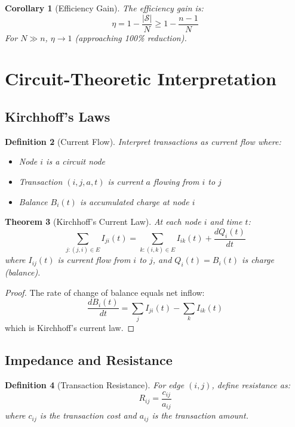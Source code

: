 \documentclass[12pt]{article}
\newtheorem{theorem}{Theorem}
\newtheorem{definition}[theorem]{Definition}
\newtheorem{corollary}[theorem]{Corollary}
\begin{document}
\begin{corollary}[Efficiency Gain]
The efficiency gain is:
$$
\eta = 1 - \frac{|\mathcal{S}|}{N} \geq 1 - \frac{n-1}{N}
$$
For $N \gg n$, $\eta \to 1$ (approaching 100\% reduction).
\end{corollary}

\section{Circuit-Theoretic Interpretation}

\subsection{Kirchhoff's Laws}

\begin{definition}[Current Flow]
Interpret transactions as current flow where:
\begin{itemize}
    \item Node $i$ is a circuit node
    \item Transaction $(i,j,a,t)$ is current $a$ flowing from $i$ to $j$
    \item Balance $B_i(t)$ is accumulated charge at node $i$
\end{itemize}
\end{definition}

\begin{theorem}[Kirchhoff's Current Law]
At each node $i$ and time $t$:
$$
\sum_{j : (j,i) \in E} I_{ji}(t) = \sum_{k : (i,k) \in E} I_{ik}(t) + \frac{dQ_i(t)}{dt}
$$
where $I_{ij}(t)$ is current flow from $i$ to $j$, and $Q_i(t) = B_i(t)$ is charge (balance).
\end{theorem}

\begin{proof}
The rate of change of balance equals net inflow:
$$
\frac{dB_i(t)}{dt} = \sum_{j} I_{ji}(t) - \sum_{k} I_{ik}(t)
$$
which is Kirchhoff's current law.
\end{proof}

\subsection{Impedance and Resistance}

\begin{definition}[Transaction Resistance]
For edge $(i,j)$, define resistance as:
$$
R_{ij} = \frac{c_{ij}}{a_{ij}}
$$
where $c_{ij}$ is the transaction cost and $a_{ij}$ is the transaction amount.
\end{definition}
\end{document}
